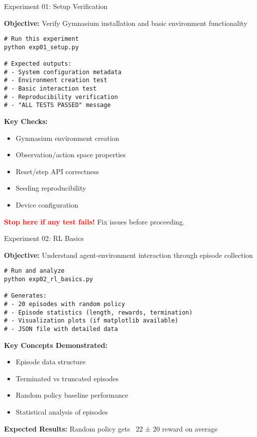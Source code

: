 \documentclass[aspectratio=169,10pt]{beamer}
\begin{document}
\begin{frame}[fragile]{Experiment 01: Setup Verification}

\textbf{Objective:} Verify Gymnasium installation and basic environment functionality

\begin{lstlisting}
# Run this experiment
python exp01_setup.py

# Expected outputs:
# - System configuration metadata
# - Environment creation test
# - Basic interaction test  
# - Reproducibility verification
# - "ALL TESTS PASSED" message
\end{lstlisting}

\vfill

\textbf{Key Checks:}
\begin{itemize}
    \item Gymnasium environment creation
    \item Observation/action space properties  
    \item Reset/step API correctness
    \item Seeding reproducibility
    \item Device configuration
\end{itemize}

\vfill

\textcolor{red}{\textbf{Stop here if any test fails!}} Fix issues before proceeding.

\end{frame}

\begin{frame}[fragile]{Experiment 02: RL Basics}

\textbf{Objective:} Understand agent-environment interaction through episode collection

\begin{lstlisting}
# Run and analyze
python exp02_rl_basics.py

# Generates:
# - 20 episodes with random policy
# - Episode statistics (length, rewards, termination)
# - Visualization plots (if matplotlib available)
# - JSON file with detailed data
\end{lstlisting}

\vfill

\textbf{Key Concepts Demonstrated:}
\begin{itemize}
    \item Episode data structure
    \item Terminated vs truncated episodes
    \item Random policy baseline performance
    \item Statistical analysis of episodes
\end{itemize}

\vfill

\textbf{Expected Results:} Random policy gets ~22 ± 20 reward on average

\end{frame}
\end{document}
